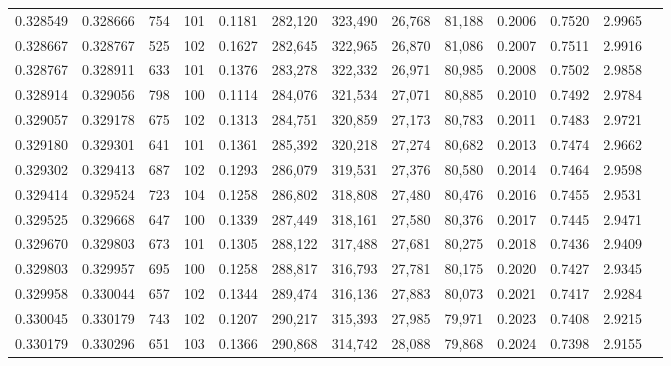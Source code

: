 \begin{tabular}{rrrrrrrrrrrrr}
0.328549 & 0.328666 &   754 & 101 &                                     0.1181 & 282,120 & 323,490 &  26,768 &  81,188 & 0.2006 & 0.7520 & 2.9965 \\
0.328667 & 0.328767 &   525 & 102 &                                     0.1627 & 282,645 & 322,965 &  26,870 &  81,086 & 0.2007 & 0.7511 & 2.9916 \\
0.328767 & 0.328911 &   633 & 101 &                                     0.1376 & 283,278 & 322,332 &  26,971 &  80,985 & 0.2008 & 0.7502 & 2.9858 \\
0.328914 & 0.329056 &   798 & 100 &                                     0.1114 & 284,076 & 321,534 &  27,071 &  80,885 & 0.2010 & 0.7492 & 2.9784 \\
0.329057 & 0.329178 &   675 & 102 &                                     0.1313 & 284,751 & 320,859 &  27,173 &  80,783 & 0.2011 & 0.7483 & 2.9721 \\
0.329180 & 0.329301 &   641 & 101 &                                     0.1361 & 285,392 & 320,218 &  27,274 &  80,682 & 0.2013 & 0.7474 & 2.9662 \\
0.329302 & 0.329413 &   687 & 102 &                                     0.1293 & 286,079 & 319,531 &  27,376 &  80,580 & 0.2014 & 0.7464 & 2.9598 \\
0.329414 & 0.329524 &   723 & 104 &                                     0.1258 & 286,802 & 318,808 &  27,480 &  80,476 & 0.2016 & 0.7455 & 2.9531 \\
0.329525 & 0.329668 &   647 & 100 &                                     0.1339 & 287,449 & 318,161 &  27,580 &  80,376 & 0.2017 & 0.7445 & 2.9471 \\
0.329670 & 0.329803 &   673 & 101 &                                     0.1305 & 288,122 & 317,488 &  27,681 &  80,275 & 0.2018 & 0.7436 & 2.9409 \\
0.329803 & 0.329957 &   695 & 100 &                                     0.1258 & 288,817 & 316,793 &  27,781 &  80,175 & 0.2020 & 0.7427 & 2.9345 \\
0.329958 & 0.330044 &   657 & 102 &                                     0.1344 & 289,474 & 316,136 &  27,883 &  80,073 & 0.2021 & 0.7417 & 2.9284 \\
0.330045 & 0.330179 &   743 & 102 &                                     0.1207 & 290,217 & 315,393 &  27,985 &  79,971 & 0.2023 & 0.7408 & 2.9215 \\
0.330179 & 0.330296 &   651 & 103 &                                     0.1366 & 290,868 & 314,742 &  28,088 &  79,868 & 0.2024 & 0.7398 & 2.9155 \\

\end{tabular}
